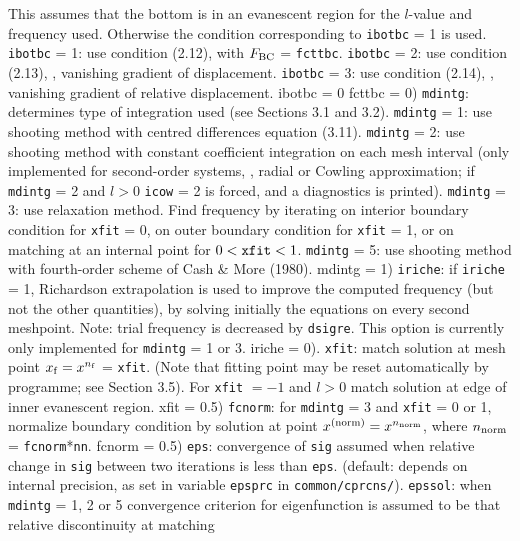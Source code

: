 This assumes that the bottom is in an evanescent region for
the $l$-value and frequency used. Otherwise the condition corresponding
to {\tt ibotbc} = 1 is used.
\pparam
{\tt ibotbc} = 1: use condition (2.12), with $F_{\rm BC}$ = {\tt fcttbc}.
\pparam
{\tt ibotbc} = 2: use condition (2.13), {\ie},
vanishing gradient of displacement.
\pparam
{\tt ibotbc} = 3: use condition (2.14), {\ie},
vanishing gradient of relative displacement.
{ ibotbc = 0
fcttbc = 0})
\param
{\tt mdintg}: determines type of integration used (see Sections 3.1 and 3.2).
\pparam
{\tt mdintg} = 1: use shooting method with centred
differences equation (3.11).
\pparam
{\tt mdintg} = 2: use shooting method with constant coefficient integration on 
each mesh interval (only implemented for second-order systems, {\ie},
radial or Cowling approximation; if {\tt mdintg} = 2
and $l > 0$ {\tt icow} = 2 is forced, and a diagnostics is printed).
\pparam
{\tt mdintg} = 3: use relaxation method.
Find frequency by iterating on interior
boundary condition for {\tt xfit} = 0, on outer boundary
condition for {\tt xfit} = 1, or on matching at an internal point for
$0 < {\tt xfit} < 1$.
\pparam
{\tt mdintg} = 5: use shooting method with fourth-order scheme
of Cash \& More (1980).
{ mdintg = 1})
\param
{\tt iriche}: if {\tt iriche} = 1, Richardson extrapolation is used to
improve the computed frequency (but not the other quantities),
by solving initially the equations on every second meshpoint.
Note: trial frequency is decreased by {\tt dsigre}.
This option is currently only implemented for {\tt mdintg} = 1 or 3.
{ iriche = 0}).
\param
{\tt xfit}: match solution at mesh point $x_{\rm f} = x^{n_{\rm f}}$ = {\tt xfit}.
(Note that fitting point may be reset automatically by programme;
see Section 3.5).
For {\tt xfit} $= -1$ and $l > 0$ match solution at
edge of inner evanescent region.
{ xfit = 0.5})
\param
{\tt fcnorm}: for {\tt mdintg} = 3 and {\tt xfit} = 0 or 1,
normalize boundary condition 
by solution at point $x^{\rm (norm)} = x^{n_{\rm norm}}$,
where $n_{\rm norm}$ = {\tt fcnorm}*{\tt nn}.
{ fcnorm = 0.5})
\param
{\tt eps}: convergence of {\tt sig} assumed when relative change in 
{\tt sig} between two iterations is less than {\tt eps}.
\ppparam
(default: depends on internal precision, as set in variable {\tt epsprc}
in {\tt common/cprcns/}).
\param
{\tt epssol}: when {\tt mdintg} = 1, 2 or 5
convergence criterion for eigenfunction is
assumed to be that relative discontinuity at matching
